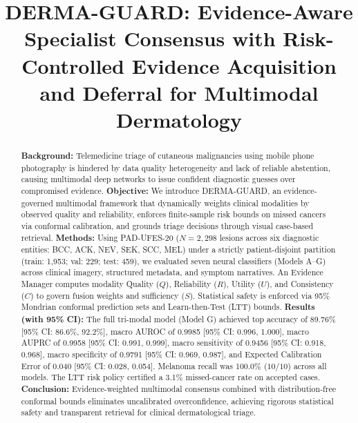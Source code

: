 \documentclass[conference]{IEEEtran}
\begin{document}
\title{DERMA-GUARD: Evidence-Aware Specialist Consensus with Risk-Controlled Evidence Acquisition and Deferral for Multimodal Dermatology\\

}

\author{
\and
{}
}

\maketitle

\begin{abstract}
\textbf{Background:} Telemedicine triage of cutaneous malignancies using mobile phone photography is hindered by data quality heterogeneity and lack of reliable abstention, causing multimodal deep networks to issue confident diagnostic guesses over compromised evidence.
\textbf{Objective:} We introduce DERMA-GUARD, an evidence-governed multimodal framework that dynamically weights clinical modalities by observed quality and reliability, enforces finite-sample risk bounds on missed cancers via conformal calibration, and grounds triage decisions through visual case-based retrieval.
\textbf{Methods:} Using PAD-UFES-20 ($N=2,298$ lesions across six diagnostic entities: BCC, ACK, NEV, SEK, SCC, MEL) under a strictly patient-disjoint partition (train: 1,953; val: 229; test: 459), we evaluated seven neural classifiers (Models A--G) across clinical imagery, structured metadata, and symptom narratives. An Evidence Manager computes modality Quality ($Q$), Reliability ($R$), Utility ($U$), and Consistency ($C$) to govern fusion weights and sufficiency ($S$). Statistical safety is enforced via 95\% Mondrian conformal prediction sets and Learn-then-Test (LTT) bounds.
\textbf{Results (with 95\% CI):} The full tri-modal model (Model G) achieved top accuracy of 89.76\% [95\% CI: 86.6\%, 92.2\%], macro AUROC of 0.9985 [95\% CI: 0.996, 1.000], macro AUPRC of 0.9958 [95\% CI: 0.991, 0.999], macro sensitivity of 0.9456 [95\% CI: 0.918, 0.968], macro specificity of 0.9791 [95\% CI: 0.969, 0.987], and Expected Calibration Error of 0.040 [95\% CI: 0.028, 0.054]. Melanoma recall was 100.0\% ($10/10$) across all models. The LTT risk policy certified a 3.1\% missed-cancer rate on accepted cases.
\textbf{Conclusion:} Evidence-weighted multimodal consensus combined with distribution-free conformal bounds eliminates uncalibrated overconfidence, achieving rigorous statistical safety and transparent retrieval for clinical dermatological triage.
\end{abstract}
\end{document}

